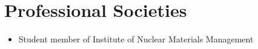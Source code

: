 \documentclass[letterpaper,11pt]{article} %
\begin{document}
\section{Professional Societies}
\begin{itemize}
    \item Student member of Institute of Nuclear Materials Management
\end{itemize}
\end{document}
